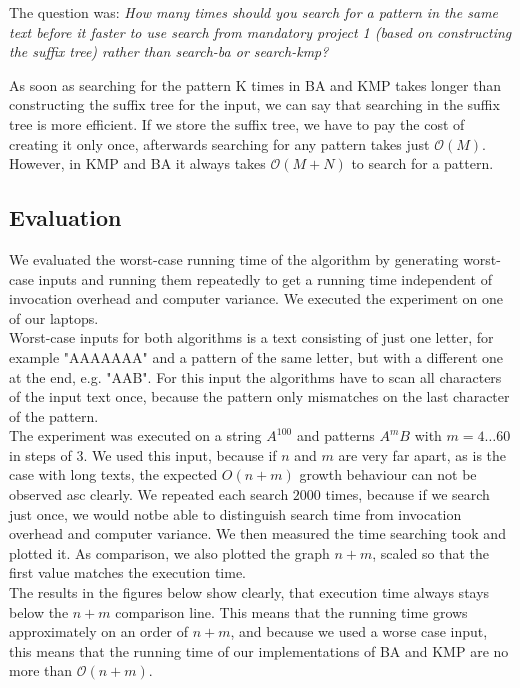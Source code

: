 \documentclass[a4paper,10pt]{article}
\begin{document}
The question was:
\emph{How many times should you search for a pattern in the same text before it faster to use search from mandatory project 1 (based on constructing the suffix tree) rather than search-ba or search-kmp?}

As soon as searching for the pattern K times in BA and KMP takes longer
than constructing the suffix tree for the input, we can say that searching in
the suffix tree is more efficient.
If we store the suffix tree, we have to pay the cost of creating it only once,
afterwards searching for any pattern takes just $\mathcal{O}(M)$.
However, in KMP and BA it always takes $\mathcal{O}(M+N)$ to search for a pattern.
\clearpage

\subsection*{Evaluation}
We evaluated the worst-case running time of the algorithm by generating worst-case inputs and running them repeatedly to get a running time independent of invocation overhead and computer variance. We executed the experiment on one of our laptops.\\

Worst-case inputs for both algorithms is a text consisting of just one letter, for example "AAAAAAA" and a pattern of the same letter, but with a different one at the end, e.g. "AAB". For this input the algorithms have to scan all characters of the input text once, because the pattern only mismatches on the last character of the pattern.\\

The experiment was executed on a string $A^{100}$ and patterns $A^{m}B$ with $m = 4\ldots60$ in steps of 3. We used this input, because if $n$ and $m$ are very far apart, as is the case with long texts, the expected $O(n+m)$ growth behaviour can not be observed asc clearly. We repeated each search $2000$ times, because if we search just once, we would notbe able to distinguish search time from invocation overhead and computer variance. We then measured the time searching took and plotted it. As comparison, we also plotted the graph $n+m$, scaled so that the first value matches the execution time.\\

The results in the figures below show clearly, that execution time always stays below the $n+m$ comparison line. This means that the running time grows approximately on an order of $n+m$, and because we used a worse case input, this means that the running time of our implementations of BA and KMP are no more than $\mathcal{O}(n+m)$. 
\end{document}
